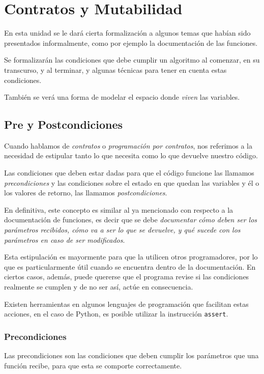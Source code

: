 \chapter{Contratos y Mutabilidad}

En esta unidad se le dará cierta formalización a algunos temas que habían sido
presentados informalmente, como por ejemplo la documentación de las funciones.

Se formalizarán las condiciones que debe cumplir un algoritmo al comenzar, en
su transcurso, y al terminar, y algunas técnicas para tener en cuenta estas
condiciones.

También se verá una forma de modelar el espacio donde \textit{viven} las
variables.

\section{Pre y Postcondiciones}

Cuando hablamos de \textit{contratos} o \textit{programación por
contratos}, nos referimos a la necesidad de estipular tanto lo que necesita
como lo que devuelve nuestro código.

Las condiciones que deben estar dadas para que el código funcione las llamamos
\emph{precondiciones} y las condiciones sobre el estado en que quedan las
variables y él o los valores de retorno, las llamamos \emph{postcondiciones}.

En definitiva, este concepto es similar al ya mencionado con respecto a la
documentación de funciones, es decir que se debe \emph{documentar cómo deben
ser los parámetros recibidos, cómo va a ser lo que se devuelve, y qué
sucede con los parámetros en caso de ser modificados}.

Esta estipulación es mayormente para que la utilicen otros programadores,
por lo que es particularmente útil cuando se encuentra dentro de la
documentación. En ciertos casos, además, puede quererse que el programa
revise si las condiciones realmente se cumplen y de no ser así, actúe en
consecuencia.

Existen herramientas en algunos lenguajes de programación que facilitan estas
acciones, en el caso de Python, es posible utilizar la instrucción
\lstinline!assert!.

\subsection{Precondiciones}

Las precondiciones son las condiciones que deben cumplir los parámetros que
una función recibe, para que esta se comporte correctamente.

